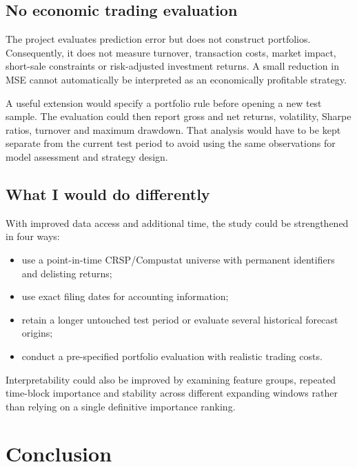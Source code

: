 \documentclass[11pt,a4paper]{article}
\begin{document}
\subsection{No economic trading evaluation}

The project evaluates prediction error but does not construct portfolios.
Consequently, it does not measure turnover, transaction costs, market impact,
short-sale constraints or risk-adjusted investment returns. A small reduction
in MSE cannot automatically be interpreted as an economically profitable
strategy.

A useful extension would specify a portfolio rule before opening a new test
sample. The evaluation could then report gross and net returns, volatility,
Sharpe ratios, turnover and maximum drawdown. That analysis would have to be
kept separate from the current test period to avoid using the same observations
for model assessment and strategy design.

\subsection{What I would do differently}

With improved data access and additional time, the study could be strengthened
in four ways:

\begin{itemize}
  \item use a point-in-time CRSP/Compustat universe with permanent identifiers
        and delisting returns;
  \item use exact filing dates for accounting information;
  \item retain a longer untouched test period or evaluate several historical
        forecast origins;
  \item conduct a pre-specified portfolio evaluation with realistic trading
        costs.
\end{itemize}

Interpretability could also be improved by examining feature groups, repeated
time-block importance and stability across different expanding windows rather
than relying on a single definitive importance ranking.


\section{Conclusion}
\label{sec:conclusion}
\end{document}
